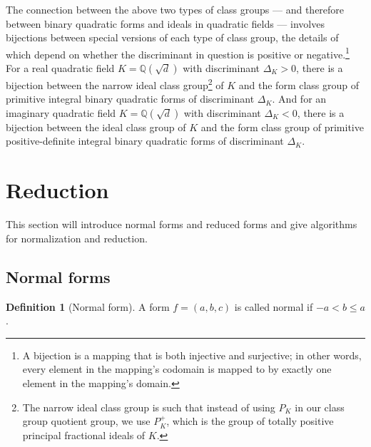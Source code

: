 \documentclass{article}
\theoremstyle{definition}
\newtheorem{definition}{Definition}[section]
\theoremstyle{theorem}
\theoremstyle{example}
\theoremstyle{corollary}
\begin{document}
The connection between the above two types of class groups --- and therefore between binary quadratic forms and ideals in quadratic fields --- involves bijections between special versions of each type of class group, the details of which depend on whether the discriminant in question is positive or negative.\footnote{A bijection is a mapping that is both injective and surjective; in other words, every element in the mapping's codomain is mapped to by exactly one element in the mapping's domain.} For a real quadratic field \(K = \mathbb{Q}(\sqrt{d})\) with discriminant \(\Delta_{K} > 0\), there is a bijection between the narrow ideal class group\footnote{The narrow ideal class group is such that instead of using \(P_{K}\) in our class group quotient group, we use \(P_{K}^{+}\), which is the group of totally positive principal fractional ideals of \(K\).} of \(K\) and the form class group of primitive integral binary quadratic forms of discriminant \(\Delta_{K}\). And for an imaginary quadratic field \(K = \mathbb{Q}(\sqrt{d})\) with discriminant \(\Delta_{K} < 0\), there is a bijection between the ideal class group of \(K\) and the form class group of primitive positive-definite integral binary quadratic forms of discriminant \(\Delta_{K}\).







\bigskip








\section{Reduction}

\bigskip

This section will introduce normal forms and reduced forms and give algorithms for normalization and reduction.

\bigskip

\subsection{Normal forms}

\bigskip

\theoremstyle{definition}
\begin{definition}[Normal form]
A form \(f = (a, b, c)\) is called normal if \(-a < b \le a\).
\end{definition}
\end{document}
